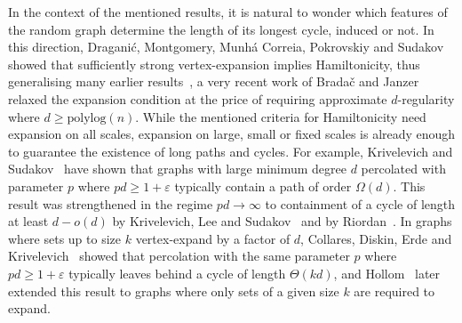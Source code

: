 \documentclass[reqno,a4paper]{amsart}
\theoremstyle{definition}
\newcommand{\eps}{\varepsilon}
\begin{document}
In the context of the mentioned results, it is natural to wonder which features of the random graph determine the length of its longest cycle, induced or not.
In this direction, Dragani\'c, Montgomery, Munh\'a Correia, Pokrovskiy and Sudakov~\cite{DMM-CPS24} showed that sufficiently strong vertex-expansion implies Hamiltonicity, thus generalising many earlier results~\cite{B83a,FK02,zbMATH07945724,zbMATH05848528,KS03,P76}, a very recent work of Brada\v{c} and Janzer~\cite{BJ26} relaxed the expansion condition at the price of requiring approximate $d$-regularity where $d\ge \mathrm{polylog}(n)$.
While the mentioned criteria for Hamiltonicity need expansion on all scales, expansion on large, small or fixed scales is already enough to guarantee the existence of long paths and cycles.
For example, Krivelevich and Sudakov~\cite{KS13} have shown that graphs with large minimum degree $d$ percolated with parameter $p$ where $pd\ge 1+\eps$ typically contain a path of order $\Omega(d)$. 
This result was strengthened in the regime $pd\to \infty$ to containment of a cycle of length at least $d-o(d)$ by Krivelevich, Lee and Sudakov~\cite{KLS15} and by Riordan~\cite{Rio14}.
In graphs where sets up to size $k$ vertex-expand by a factor of $d$, Collares, Diskin, Erde and Krivelevich~\cite{CDEK24} showed that percolation with the same parameter $p$ where $pd\ge 1+\eps$ typically leaves behind a cycle of length $\Theta(kd)$, and Hollom~\cite{H25} later extended this result to graphs where only sets of a given size $k$ are required to expand.
\end{document}
